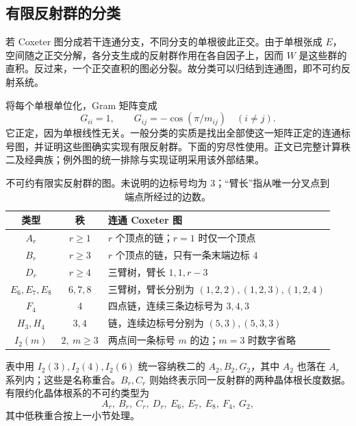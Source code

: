 \subsection{有限反射群的分类}
\label{g1:subsec:E02:05}

若 Coxeter 图分成若干连通分支，不同分支的单根彼此正交。由于单根张成 \(E\)，空间随之正交分解，各分支生成的反射群作用在各自因子上，因而 \(W\) 是这些群的直积。反过来，一个正交直积的图必分裂。故分类可以归结到连通图，即不可约反射系统。

\ProseParagraphBreak

将每个单根单位化，Gram 矩阵变成
\[
	G_{ii}=1,\qquad G_{ij}=-\cos(\pi/m_{ij})\quad(i\ne j).
\]
它正定，因为单根线性无关。一般分类的实质是找出全部使这一矩阵正定的连通标号图，并证明这些图确实实现有限反射群。下面的穷尽性使用\cite[定理C.1.2，第433页；表6.1，第104页；证明见第C.2--C.3节]{Davis2008Coxeter}。正文已完整计算秩二及经典族；例外图的统一排除与实现证明采用该外部结果。

\begin{table}[htbp]
	\centering
	\caption[不可约有限实反射群的图]{不可约有限实反射群的图。未说明的边标号均为 \(3\)；“臂长”指从唯一分叉点到端点所经过的边数。}
	\label{g1:tab:finite-reflection-classification}
	\begin{tabularx}{\textwidth}{c c X}
		\toprule
		类型&秩&连通 Coxeter 图\\
		\midrule
		\(A_r\)&\(r\ge1\)&\(r\) 个顶点的链；\(r=1\) 时仅一个顶点\\
		\(B_r\)&\(r\ge3\)&\(r\) 个顶点的链，只有一条末端边标 \(4\)\\
		\(D_r\)&\(r\ge4\)&三臂树，臂长 \(1,1,r-3\)\\
		\(E_6,E_7,E_8\)&\(6,7,8\)&三臂树，臂长分别为 \((1,2,2),(1,2,3),(1,2,4)\)\\
		\(F_4\)&4&四点链，连续三条边标号为 \(3,4,3\)\\
		\(H_3,H_4\)&\(3,4\)&链，连续边标号分别为 \((5,3),(5,3,3)\)\\
		\(I_2(m)\)&\(2,\ m\ge3\)&两点间一条标号 \(m\) 的边；\(m=3\) 时数字省略\\
		\bottomrule
	\end{tabularx}
\end{table}

表中用 \(I_2(3),I_2(4),I_2(6)\) 统一容纳秩二的 \(A_2,B_2,G_2\)，其中 \(A_2\) 也落在 \(A_r\) 系列内；这些是名称重合。\(B_r,C_r\) 则始终表示同一反射群的两种晶体根长度数据。有限约化晶体根系的不可约类型为
\[
	A_r,\ B_r,\ C_r,\ D_r,\ E_6,\ E_7,\ E_8,\ F_4,\ G_2,
\]
其中低秩重合按上一小节处理。

